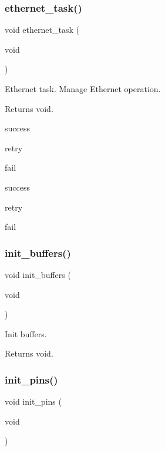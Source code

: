 \subsubsection{\texorpdfstring{ethernet\+\_\+task()}{ethernet\_task()}}
{\footnotesize\ttfamily void ethernet\+\_\+task (\begin{DoxyParamCaption}\item[{void}]{ }\end{DoxyParamCaption})}



Ethernet task. Manage Ethernet operation. 

\begin{DoxyReturn}{Returns}
void. 
\end{DoxyReturn}
success

retry

fail

success

retry

fail \mbox{\label{rmap_8ino_ad241cc00b1a92e6d85827df96778e442}} 
\subsubsection{\texorpdfstring{init\+\_\+buffers()}{init\_buffers()}}
{\footnotesize\ttfamily void init\+\_\+buffers (\begin{DoxyParamCaption}\item[{void}]{ }\end{DoxyParamCaption})}



Init buffers. 

\begin{DoxyReturn}{Returns}
void. 
\end{DoxyReturn}
\mbox{\label{rmap_8ino_ad8b80a0c08f928106018edd6ea435b95}} 
\subsubsection{\texorpdfstring{init\+\_\+pins()}{init\_pins()}}
{\footnotesize\ttfamily void init\+\_\+pins (\begin{DoxyParamCaption}\item[{void}]{ }\end{DoxyParamCaption})}



